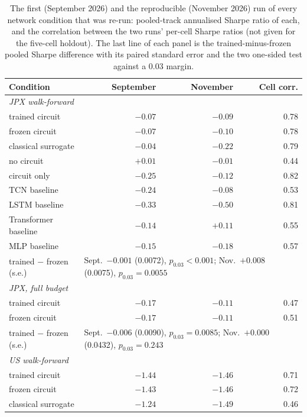 \begin{table}[t]
\centering
\caption{The first (September 2026) and the reproducible (November 2026) run of every network condition that was re-run: pooled-track annualised Sharpe ratio of each, and the correlation between the two runs' per-cell Sharpe ratios (not given for the five-cell holdout). The last line of each panel is the trained-minus-frozen pooled Sharpe difference with its paired standard error and the two one-sided test against a 0.03 margin.}
\label{tab:rerun}
\small
\begin{tabular}{lrrr}
\toprule
Condition & September & November & Cell corr. \\
\midrule
\multicolumn{4}{l}{\emph{JPX walk-forward}} \\
\quad trained circuit & $-0.07$ & $-0.09$ & 0.78 \\
\quad frozen circuit & $-0.07$ & $-0.10$ & 0.78 \\
\quad classical surrogate & $-0.04$ & $-0.22$ & 0.79 \\
\quad no circuit & $+0.01$ & $-0.01$ & 0.44 \\
\quad circuit only & $-0.25$ & $-0.12$ & 0.82 \\
\quad TCN baseline & $-0.24$ & $-0.08$ & 0.53 \\
\quad LSTM baseline & $-0.33$ & $-0.50$ & 0.81 \\
\quad Transformer baseline & $-0.14$ & $+0.11$ & 0.55 \\
\quad MLP baseline & $-0.15$ & $-0.18$ & 0.57 \\
\quad trained $-$ frozen (s.e.) & \multicolumn{3}{l}{Sept.\ $-0.001$ (0.0072), $p_{0.03}<0.001$; Nov.\ $+0.008$ (0.0075), $p_{0.03}=0.0055$} \\[2pt]
\multicolumn{4}{l}{\emph{JPX, full budget}} \\
\quad trained circuit & $-0.17$ & $-0.11$ & 0.47 \\
\quad frozen circuit & $-0.17$ & $-0.11$ & 0.51 \\
\quad trained $-$ frozen (s.e.) & \multicolumn{3}{l}{Sept.\ $-0.006$ (0.0090), $p_{0.03}=0.0085$; Nov.\ $+0.000$ (0.0432), $p_{0.03}=0.243$} \\[2pt]
\multicolumn{4}{l}{\emph{US walk-forward}} \\
\quad trained circuit & $-1.44$ & $-1.46$ & 0.71 \\
\quad frozen circuit & $-1.43$ & $-1.46$ & 0.72 \\
\quad classical surrogate & $-1.24$ & $-1.49$ & 0.46 \\

\end{tabular}
\end{table}
